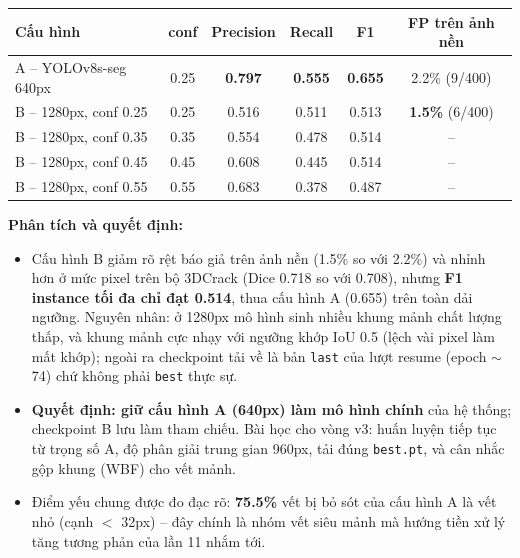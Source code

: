 \documentclass[12pt,a4paper]{article}
\begin{document}
\begin{table}[H]
\centering
\small
\begin{tabular}{lccccc}
\toprule
\textbf{Cấu hình} & \textbf{conf} & \textbf{Precision} & \textbf{Recall} & \textbf{F1} & \textbf{FP trên ảnh nền} \\
\midrule
A -- YOLOv8s-seg 640px & 0.25 & \textbf{0.797} & \textbf{0.555} & \textbf{0.655} & 2.2\% (9/400) \\
B -- 1280px, conf 0.25 & 0.25 & 0.516 & 0.511 & 0.513 & \textbf{1.5\%} (6/400) \\
B -- 1280px, conf 0.35 & 0.35 & 0.554 & 0.478 & 0.514 & -- \\
B -- 1280px, conf 0.45 & 0.45 & 0.608 & 0.445 & 0.514 & -- \\
B -- 1280px, conf 0.55 & 0.55 & 0.683 & 0.378 & 0.487 & -- \\
\bottomrule
\end{tabular}
\end{table}

\textbf{Phân tích và quyết định:}
\begin{itemize}[leftmargin=*]
    \item Cấu hình B giảm rõ rệt báo giả trên ảnh nền (1.5\% so với 2.2\%) và nhỉnh hơn ở mức pixel trên bộ 3DCrack (Dice 0.718 so với 0.708), nhưng \textbf{F1 instance tối đa chỉ đạt 0.514}, thua cấu hình A (0.655) trên toàn dải ngưỡng. Nguyên nhân: ở 1280px mô hình sinh nhiều khung mảnh chất lượng thấp, và khung mảnh cực nhạy với ngưỡng khớp IoU 0.5 (lệch vài pixel làm mất khớp); ngoài ra checkpoint tải về là bản \texttt{last} của lượt resume (epoch $\sim$74) chứ không phải \texttt{best} thực sự.
    \item \textbf{Quyết định: giữ cấu hình A (640px) làm mô hình chính} của hệ thống; checkpoint B lưu làm tham chiếu. Bài học cho vòng v3: huấn luyện tiếp tục từ trọng số A, độ phân giải trung gian 960px, tải đúng \texttt{best.pt}, và cân nhắc gộp khung (WBF) cho vết mảnh.
    \item Điểm yếu chung được đo đạc rõ: \textbf{75.5\%} vết bị bỏ sót của cấu hình A là vết nhỏ (cạnh $<$ 32px) -- đây chính là nhóm vết siêu mảnh mà hướng tiền xử lý tăng tương phản của lần 11 nhắm tới.
\end{itemize}
\end{document}
